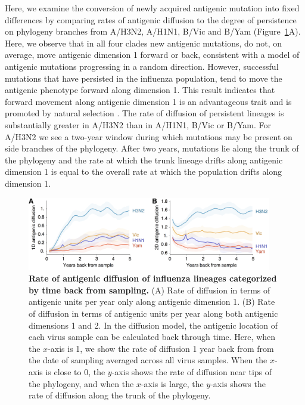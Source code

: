 \documentclass[11pt,oneside,letterpaper]{article}
\begin{document}
Here, we examine the conversion of newly acquired antigenic mutation into fixed differences by comparing rates of antigenic diffusion to the degree of persistence on phylogeny branches from A/H3N2, A/H1N1, B/Vic and B/Yam (Figure~\ref{accumulation}A).
Here, we observe that in all four clades new antigenic mutations, do not, on average, move antigenic dimension 1 forward or back, consistent with a model of antigenic mutations progressing in a random direction.
However, successful mutations that have persisted in the influenza population, tend to move the antigenic phenotype forward along dimension 1.
This result indicates that forward movement along antigenic dimension 1 is an advantageous trait and is promoted by natural selection \cite{Bedford12}.
The rate of diffusion of persistent lineages is substantially greater in A/H3N2 than in A/H1N1, B/Vic or B/Yam.
For A/H3N2 we see a two-year window during which mutations may be present on side branches of the phylogeny.
After two years, mutations lie along the trunk of the phylogeny and the rate at which the trunk lineage drifts along antigenic dimension 1 is equal to the overall rate at which the population drifts along dimension 1.

\begin{figure}[tb]
	\centering		
	\includegraphics[width=0.95\textwidth]{figures/accumulation}
	\caption{\textbf{Rate of antigenic diffusion of influenza lineages categorized by time back from sampling.}
	(A) Rate of diffusion in terms of antigenic units per year only along antigenic dimension 1.
	(B) Rate of diffusion in terms of antigenic units per year along both antigenic dimensions 1 and 2.
	In the diffusion model, the antigenic location of each virus sample can be calculated back through time.
	Here, when the $x$-axis is 1, we show the rate of diffusion 1 year back from from the date of sampling averaged across all virus samples.
	When the $x$-axis is close to 0, the $y$-axis shows the rate of diffusion near tips of the phylogeny, and when the $x$-axis is large, the $y$-axis shows the rate of diffusion along the trunk of the phylogeny.
	} 
	\label{accumulation} 
\end{figure}
\end{document}
